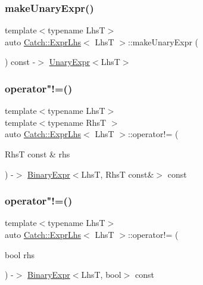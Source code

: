 \subsubsection{\texorpdfstring{make\+Unary\+Expr()}{makeUnaryExpr()}}
{\footnotesize\ttfamily template$<$typename LhsT$>$ \\
auto \mbox{\hyperlink{class_catch_1_1_expr_lhs}{Catch\+::\+Expr\+Lhs}}$<$ LhsT $>$\+::make\+Unary\+Expr (\begin{DoxyParamCaption}{ }\end{DoxyParamCaption}) const -\/$>$ \mbox{\hyperlink{class_catch_1_1_unary_expr}{Unary\+Expr}}$<$LhsT$>$ \hspace{0.3cm}{\ttfamily [inline]}}

\mbox{\label{class_catch_1_1_expr_lhs_a5e10eab8aed53dd000b89d8fd7754437}} 
\subsubsection{\texorpdfstring{operator"!=()}{operator!=()}\hspace{0.1cm}{\footnotesize\ttfamily [1/2]}}
{\footnotesize\ttfamily template$<$typename LhsT$>$ \\
template$<$typename RhsT $>$ \\
auto \mbox{\hyperlink{class_catch_1_1_expr_lhs}{Catch\+::\+Expr\+Lhs}}$<$ LhsT $>$\+::operator!= (\begin{DoxyParamCaption}\item[{RhsT const \&}]{rhs }\end{DoxyParamCaption}) -\/$>$ \mbox{\hyperlink{class_catch_1_1_binary_expr}{Binary\+Expr}}$<$LhsT, RhsT const\&$>$ const \hspace{0.3cm}{\ttfamily [inline]}}

\mbox{\label{class_catch_1_1_expr_lhs_a60eca847201d057d8a8b7222c69b619c}} 
\subsubsection{\texorpdfstring{operator"!=()}{operator!=()}\hspace{0.1cm}{\footnotesize\ttfamily [2/2]}}
{\footnotesize\ttfamily template$<$typename LhsT$>$ \\
auto \mbox{\hyperlink{class_catch_1_1_expr_lhs}{Catch\+::\+Expr\+Lhs}}$<$ LhsT $>$\+::operator!= (\begin{DoxyParamCaption}\item[{bool}]{rhs }\end{DoxyParamCaption}) -\/$>$ \mbox{\hyperlink{class_catch_1_1_binary_expr}{Binary\+Expr}}$<$LhsT, bool$>$ const \hspace{0.3cm}{\ttfamily [inline]}}

